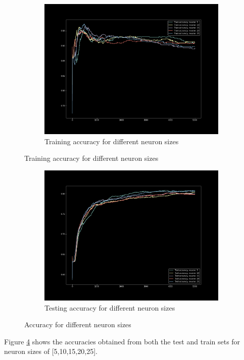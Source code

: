 \begin{figure}[H]
    \begin{subfigure}{1\textwidth}
        \centering
        \includegraphics[width=0.8\linewidth]{assets/plots/part1_Q3a_3.png}
        \caption{Training accuracy for different neuron sizes}
        \label{fig:train_neuron}
    \end{subfigure}
\end{figure}
\begin{figure}[H]
    \ContinuedFloat
    \begin{subfigure}{1\textwidth}
        \centering
        \includegraphics[width=0.8\linewidth]{assets/plots/part1_Q3a_2.png}
        \caption{Testing accuracy for different neuron sizes}
        \label{fig:test_neuron}
    \end{subfigure}
    \caption{Accuracy for different neuron sizes}
    \label{fig:neuron}
\end{figure}

Figure \ref{fig:neuron} shows the accuracies obtained from both the test and train sets for neuron sizes of [5,10,15,20,25].

